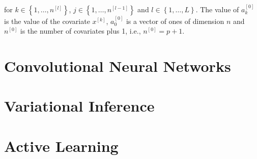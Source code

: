 for $k \in \left\{ 1, \ldots, n^{[l]} \right\}$, $j \in \left\{ 1, \ldots, n^{[l-1]} \right\}$ and $l \in \left\{ 1, \ldots, L \right\}$. The value of $a_k^{[0]}$ is the value of the covariate $x^{[k]}$, $a_0^{[0]}$ is a vector of ones of dimension $n$ and $n^{[0]}$ is the number of covariates plus 1, i.e., $n^{[0]} = p + 1$.

\section{Convolutional Neural Networks}

\section{Variational Inference}

\section{Active Learning}

